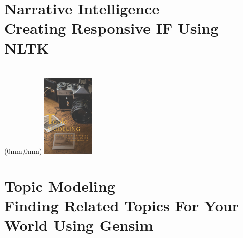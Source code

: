 \documentclass[11.75pt,openany,final]{memoir}
\begin{document}
 \chapter{Narrative Intelligence\\ \small{Creating Responsive IF Using NLTK}}
 

\chapter*{}
 \begin{textblock*}{70.9mm}(0mm,0mm)
   \includegraphics[width=\paperwidth]{./media/images/topic_cover}
 \end{textblock*}
 \chapter{Topic Modeling\\ \small{Finding Related Topics For Your World Using Gensim}}
\label{sec:topic}
 

%
\end{document}

